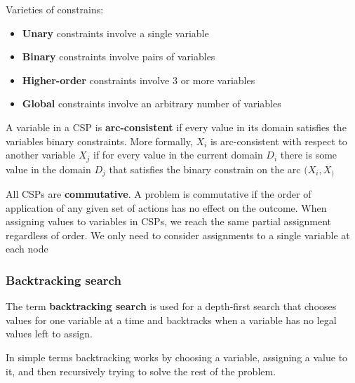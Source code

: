 \documentclass{article}
\begin{document}
Varieties of constrains:
\begin{itemize}
    \item \textbf{Unary} constraints involve a single variable
    \item \textbf{Binary} constraints involve pairs of variables
    \item \textbf{Higher-order} constraints involve 3 or more variables
    \item \textbf{Global} constraints involve an arbitrary number of variables
\end{itemize}

A variable in a CSP is \textbf{arc-consistent} if every value in its domain satisfies the variables binary constraints. 
More formally, $X_i$ is arc-consistent with respect to another variable $X_j$ if for every value in the current domain $D_i$ there is some value in the domain $D_j$ that satisfies the binary constrain on the arc $(X_i,X_)$

All CSPs are \textbf{commutative}. A problem is commutative if the order of application of any given set of actions has no effect on the outcome. When assigning values to variables in CSPs, we reach the same partial assignment regardless of order. We only need to consider assignments to a single variable at each node

\subsubsection{Backtracking search}

The term \textbf{backtracking search} is used for a depth-first search that chooses values for one variable at a time and backtracks when a variable has no legal values left to assign.

In simple terms backtracking works by choosing a variable, assigning a value to it, and then recursively trying to solve the rest of the problem.
\end{document}
